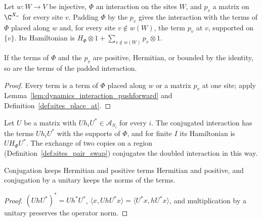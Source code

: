 \begin{definition}
    \label{def:dynamics_interaction_pad}
    \leanok
    Let $w\colon W\to V$ be injective, $\Phi$ an interaction on the sites $W$, and $p_v$ a
    matrix on $\C^{X_v}$ for every site $v$. Padding $\Phi$ by the $p_v$ gives the interaction
    with the terms of $\Phi$ placed along $w$ and, for every site $v\notin w(W)$, the term
    $p_v$ at $v$, supported on $\{v\}$. Its Hamiltonian is
    $H_\Phi\otimes1+\sum_{v\notin w(W)}p_v\otimes1$.
\end{definition}

\begin{lemma}
    \label{lem:dynamics_interaction_pad}
    \leanok
    If the terms of $\Phi$ and the $p_v$ are positive, Hermitian, or bounded by the identity,
    so are the terms of the padded interaction.
\end{lemma}
\begin{proof}\leanok
    Every term is a term of $\Phi$ placed along $w$ or a matrix $p_v$ at one site; apply
    Lemma~\ref{lem:dynamics_interaction_pushforward} and Definition~\ref{def:sites_place_at}.
\end{proof}

\begin{definition}
    \label{def:dynamics_interaction_conj}
    \leanok
    Let $U$ be a matrix with $Uh_iU^*\in\mathcal A_{S_i}$ for every $i$. The conjugated
    interaction has the terms $Uh_iU^*$ with the supports of $\Phi$, and for finite $I$ its
    Hamiltonian is $UH_\Phi U^*$. The exchange of two copies on a region
    (Definition~\ref{def:sites_pair_swap}) conjugates the doubled interaction in this way.
\end{definition}

\begin{lemma}
    \label{lem:dynamics_interaction_conj}
    \leanok
    Conjugation keeps Hermitian and positive terms Hermitian and positive, and conjugation
    by a unitary keeps the norms of the terms.
\end{lemma}
\begin{proof}\leanok
    $(UhU^*)^*=Uh^*U^*$, $\langle x,UhU^*x\rangle=\langle U^*x,hU^*x\rangle$, and
    multiplication by a unitary preserves the operator norm.
\end{proof}

